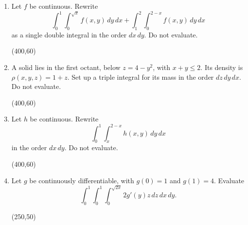 \documentclass[12pt]{exam}
\begin{document}
\begin{enumerate}

\item Let $f$ be continuous. Rewrite
\[
  \int_0^1\int_0^{\sqrt{x}}f(x,y)\,dy\,dx
  +\int_1^2\int_0^{2-x}f(x,y)\,dy\,dx
\]
as a single double integral in the order $dx\,dy$. Do not evaluate.

\vfill
\begin{flushright}
\framebox(400,60){}
\end{flushright}

\item A solid lies in the first octant, below $z=4-y^2$, with $x+y\leq2$.
Its density is $\rho(x,y,z)=1+z$. Set up a triple integral for its mass
in the order $dz\,dy\,dx$. Do not evaluate.

\vfill
\begin{flushright}
\framebox(400,60){}
\end{flushright}

\newpage

\item Let $h$ be continuous. Rewrite
\[
  \int_0^1\int_x^{2-x}h(x,y)\,dy\,dx
\]
in the order $dx\,dy$. Do not evaluate.

\vfill
\begin{flushright}
\framebox(400,60){}
\end{flushright}

\item Let $g$ be continuously differentiable, with $g(0)=1$ and $g(1)=4$.
Evaluate
\[
  \int_0^1\int_0^1\int_0^{\sqrt{2x}}2g'(y)z\,dz\,dx\,dy.
\]

\vfill
\begin{flushright}
\framebox(250,50){}
\end{flushright}

\end{enumerate}
\end{document}
